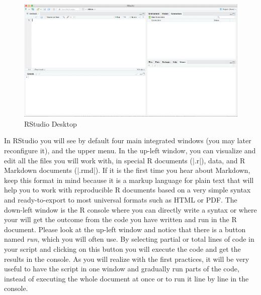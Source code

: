 \begin{figure}
\centering
\includegraphics[width=0.9\linewidth]{figures/ch3_r_studio}
\caption{RStudio Desktop}
\label{fig:r_studio}
\end{figure}

In RStudio you will see by default four main integrated windows (you
may later reconfigure it), and the upper menu. In the up-left window,
you can visualize and edit all the files you will work with, in
special R documents (|.r|), data, and R Markdown documents (|.rmd|).
If it is the first time you hear about Markdown, keep this format in
mind because it is a markup language for plain text that will help you
to work with reproducible R documents based on a very simple syntax
and ready-to-export to most universal formats such as HTML or PDF. The
down-left window is the R console where you can directly write a
syntax or where your will get the outcome from the code you have
written and run in the R document. Please look at the up-left window
and notice that there is a button named \emph{run}, which you will
often use. By selecting partial or total lines of code in your script
and clicking on this button you will execute the code and get the
results in the console.  As you will realize with the first practices,
it will be very useful to have the script in one window and gradually
run parts of the code, instead of executing the whole document at once
or to run it line by line in the console.

